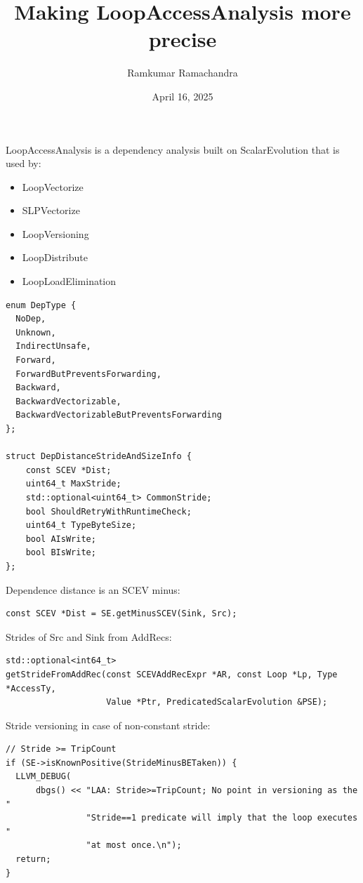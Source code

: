 \documentclass{beamer}
\title{Making LoopAccessAnalysis more precise}
\author{Ramkumar Ramachandra}
\institute{Codasip}
\date{April 16, 2025}
\begin{document}
\begin{frame}
  \titlepage
\end{frame}
\begin{frame}
  LoopAccessAnalysis is a dependency analysis built on ScalarEvolution that is used by:
  \begin{itemize}
    \item LoopVectorize
    \item SLPVectorize
    \item LoopVersioning
    \item LoopDistribute
    \item LoopLoadElimination
  \end{itemize}
\end{frame}

\begin{frame}[containsverbatim]
  \begin{verbatim}
enum DepType {
  NoDep,
  Unknown,
  IndirectUnsafe,
  Forward,
  ForwardButPreventsForwarding,
  Backward,
  BackwardVectorizable,
  BackwardVectorizableButPreventsForwarding
};

struct DepDistanceStrideAndSizeInfo {
    const SCEV *Dist;
    uint64_t MaxStride;
    std::optional<uint64_t> CommonStride;
    bool ShouldRetryWithRuntimeCheck;
    uint64_t TypeByteSize;
    bool AIsWrite;
    bool BIsWrite;
};
  \end{verbatim}
\end{frame}

\begin{frame}[containsverbatim]
  Dependence distance is an SCEV minus:
  \begin{verbatim}
const SCEV *Dist = SE.getMinusSCEV(Sink, Src);
  \end{verbatim}
  \vspace{2em}
  Strides of Src and Sink from AddRecs:
  \begin{verbatim}
std::optional<int64_t>
getStrideFromAddRec(const SCEVAddRecExpr *AR, const Loop *Lp, Type *AccessTy,
                    Value *Ptr, PredicatedScalarEvolution &PSE);
  \end{verbatim}
  \vspace{2em}
  Stride versioning in case of non-constant stride:
  \begin{verbatim}
// Stride >= TripCount
if (SE->isKnownPositive(StrideMinusBETaken)) {
  LLVM_DEBUG(
      dbgs() << "LAA: Stride>=TripCount; No point in versioning as the "
                "Stride==1 predicate will imply that the loop executes "
                "at most once.\n");
  return;
}
  \end{verbatim}
\end{frame}
\end{document}
